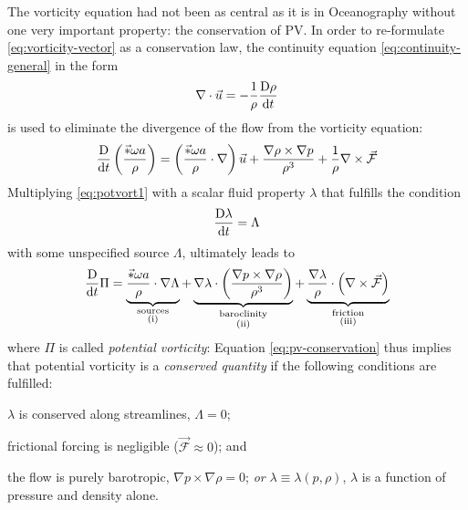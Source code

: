 The vorticity equation had not been as central as it is in Oceanography without one very important property: the conservation of \ac{PV}. In order to re-formulate \eqref{eq:vorticity-vector} as a conservation law, the continuity equation \eqref{eq:continuity-general} in the form
%
\begin{equation}
\nabla\cdot\vec{u} = -\frac{1}{\rho} \Ddx[\rho]
\end{equation}
%
is used to eliminate the divergence of the flow from the vorticity equation:
%
\begin{equation}
\Ddx \left( \frac{\vec*{\omega}{a}}{\rho} \right) = \left( \frac{\vec*{\omega}{a}}{\rho} \cdot \nabla \right) \vec{u} + \frac{\nabla\rho\times\nabla p}{\rho^3} + \frac{1}{\rho} \nabla\times\vec{\mathcal{F}} \label{eq:potvort1}
\end{equation}
%
Multiplying \eqref{eq:potvort1} with a scalar fluid property \(\lambda\) that fulfills the condition
%
\begin{equation}
\Ddx[\lambda] = \Lambda
\end{equation}
%
with some unspecified source \(\Lambda\), ultimately leads to
%
\begin{equation}
\label{eq:pv-conservation}
\Ddx \Pi = 
\underbrace{\frac{\vec*{\omega}{a}}{\rho} \cdot \nabla \Lambda \vphantom{\frac{\nabla}{\rho^3}}}_{\substack{\text{sources}\\\text{(i)}}}
+ \underbrace{\nabla \lambda \cdot \left( \frac{\nabla p \times \nabla \rho}{\rho^3}\right)}_{\substack{\text{baroclinity}\\\text{(ii)}}}
+ \underbrace{\frac{\nabla\lambda}{\rho} \cdot \left(\nabla\times\vec{\mathcal{F}}\right)}_{\substack{\text{friction}\\\text{(iii)}}}
\end{equation}
%
where \(\Pi\) is called \emph{potential vorticity}:
%
%
Equation \ref{eq:pv-conservation} thus implies that potential vorticity is a \emph{conserved quantity} if the following conditions are fulfilled:
\begin{renum}
	\item \(\lambda\) is conserved along streamlines, \ie \(\Lambda = 0\);
	\item frictional forcing is negligible (\(\vec{\mathcal{F}} \approx 0\)); and
	\item the flow is purely barotropic, \ie \(\nabla p \times \nabla \rho = 0\); \emph{or} \(\lambda \equiv \lambda(p,\rho)\), \ie \(\lambda\) is a function of pressure and density alone.
\end{renum} 
